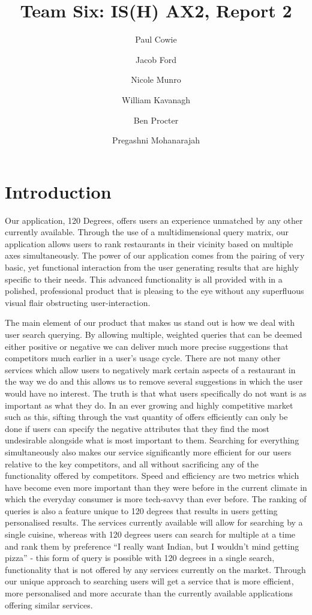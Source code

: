 \documentclass[10pt,a4paper]{article}
\author{Paul Cowie \and Jacob Ford \and Nicole Munro \and William Kavanagh \and Ben Procter \and Pregashni Mohanarajah }
\date{}
\title{Team Six: IS(H) AX2, Report 2}
\begin{document}
\maketitle

\section*{Introduction}

Our application, 120 Degrees, offers users an experience unmatched by any other currently available. Through the use of a multidimensional query matrix, our application allows users to rank restaurants in their vicinity based on multiple axes simultaneously. The power of our application comes from the pairing of very basic, yet functional interaction from the user generating results that are highly specific to their needs. This advanced functionality is all provided with in a polished, professional product that is pleasing to the eye without any superfluous visual flair obstructing user-interaction.

The main element of our product that makes us stand out is how we deal with user search querying. By allowing multiple, weighted queries that can be deemed either positive or negative we can deliver much more precise suggestions that competitors much earlier in a user’s usage cycle. There are not many other services which allow users to negatively mark certain aspects of a restaurant in the way we do and this allows us to remove several suggestions in which the user would have no interest. The truth is that what users specifically do not want is as important as what they do. In an ever growing and highly competitive market such as this, sifting through the vast quantity of offers efficiently can only be done if users can specify the negative attributes that they find the most undesirable alongside what is most important to them. Searching for everything simultaneously also makes our service significantly more efficient for our users relative to the key competitors, and all without sacrificing any of the functionality offered by competitors. Speed and efficiency are two metrics which have become even more important than they were before in the current climate in which the everyday consumer is more tech-savvy than ever before. The ranking of queries is also a feature unique to 120 degrees that results in users getting personalised results. The services currently available will allow for searching by a single cuisine, whereas with 120 degrees users can search for multiple at a time and rank them by preference “I really want Indian, but I wouldn’t mind getting pizza” - this form of query is possible with 120 degrees in a single search, functionality that is not offered by any services currently on the market. Through our unique approach to searching users will get a service that is more efficient, more personalised and more accurate than the currently available applications offering similar services.
\end{document}
